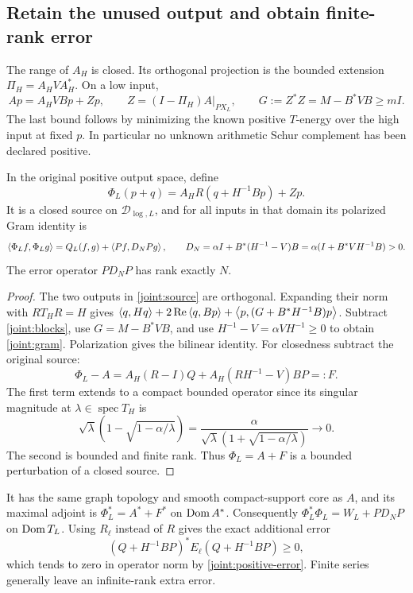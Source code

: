 \subsection{Retain the unused output and obtain finite-rank error}
The range of $A_H$ is closed. Its orthogonal projection is the
bounded extension $\Pi_H=A_HVA_H^*$. On a low input,
\[
Ap=A_HVBp+Zp,\qquad
Z=(I-\Pi_H)A|_{PX_L},\qquad
G:=Z^*Z=M-B^*VB\ge mI.
\]
The last bound follows by minimizing the known positive $T$-energy
over the high input at fixed $p$. In particular no unknown
arithmetic Schur complement has been declared positive.

\begin{theorem}\label{joint:completion}
In the original positive output space, define
\begin{equation}\label{joint:source}
\Phi_L(p+q)=A_HR(q+H^{-1}Bp)+Zp .
\end{equation}
It is a closed source on $\mathcal D_{\log,L}$, and for all
inputs in that domain its polarized Gram identity is
\begin{equation}\label{joint:gram}
\left\langle\Phi_Lf,\Phi_Lg\right\rangle=Q_L(f,g)+\left\langle Pf,D_NPg\right\rangle,
\qquad
D_N=\alpha I+B^*(H^{-1}-V)B
    =\alpha(I+B^*VH^{-1}B)>0.
\end{equation}
The error operator $PD_NP$ has rank exactly $N$.
\end{theorem}
\begin{proof}
The two outputs in \eqref{joint:source} are orthogonal. Expanding
their norm with $RT_HR=H$ gives
$\left\langle q,Hq\right\rangle+2\operatorname{Re}\left\langle q,Bp\right\rangle
+\left\langle p,(G+B^*H^{-1}B)p\right\rangle$.
Subtract \eqref{joint:blocks}, use $G=M-B^*VB$, and use
$H^{-1}-V=\alpha VH^{-1}\ge0$ to obtain \eqref{joint:gram}.
Polarization gives the bilinear identity.
For closedness subtract the original source:
\begin{equation}\label{joint:correction}
\Phi_L-A=A_H(R-I)Q+
                 A_H(RH^{-1}-V)BP=:F.
\end{equation}
The first term extends to a compact bounded operator since its
singular magnitude at $\lambda\in\operatorname{spec}T_H$ is
\[
\sqrt\lambda(1-\sqrt{1-\alpha/\lambda})
 =\frac{\alpha}{\sqrt\lambda(1+\sqrt{1-\alpha/\lambda})}
 \longrightarrow0.
\]
The second is bounded and finite rank. Thus $\Phi_L=A+F$ is a
bounded perturbation of a closed source.
\end{proof}

It has the same graph topology and smooth compact-support core
as $A$, and its maximal adjoint is
$\Phi_L^*=A^*+F^*$ on $\operatorname{Dom} A^*$.
Consequently
$\Phi_L^*\Phi_L=W_L+PD_NP$ on $\operatorname{Dom} T_L$.
Using $R_\ell$ instead of $R$ gives the exact additional error
\[
(Q+H^{-1}BP)^*E_\ell(Q+H^{-1}BP)\ge0,
\]
which tends to zero in operator norm by
\eqref{joint:positive-error}.
Finite series generally leave an infinite-rank extra error.

